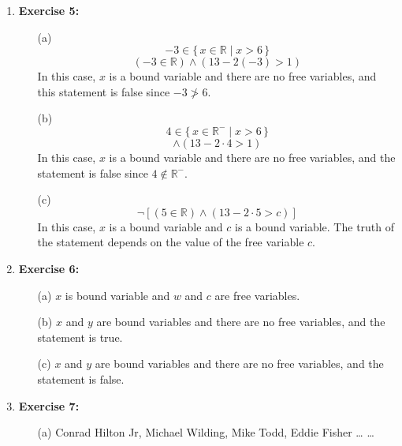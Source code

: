 \documentclass{article} %
\newcommand\Set[2]{\{\,#1\mid#2\,\}}
\begin{document}
\begin{enumerate}
        \item \textbf{Exercise 5:}
        \begin{itemize}
            \item[(a)] 
            \begin{equation*}
                -3 \in \Set{x \in \mathbb{R}}{x > 6}    
            \end{equation*} 
            \begin{equation*}
                (-3 \in \mathbb{R}) \land (13 - 2(-3) > 1)
            \end{equation*}
            In this case, $x$ is a bound variable and there are no free variables, and this statement is false since $-3 \ngtr 6$.
            \item[(b)]
            \begin{equation*}
                4 \in \Set{x \in \mathbb{R}^{-}}{x > 6}
            \end{equation*}
            \begin{equation*}
                [(4 \in \mathbb{R}) \land (4 < 0)] \land (13 - 2 \cdot 4 > 1)
            \end{equation*}
            In this case, $x$ is a bound variable and there are no free variables, and the statement is false since $4 \notin \mathbb{R}^{-}$.
            \item[(c)]
            \begin{equation*}
                \neg [(5 \in \mathbb{R}) \land (13 - 2 \cdot 5 > c)]
            \end{equation*}
            In this case, $x$ is a bound variable and $c$ is a bound variable. The truth of the statement depends on the value of the free variable $c$.
        \end{itemize}

        \item \textbf{Exercise 6:}
        \begin{itemize}
            \item[(a)] $x$ is bound variable and $w$ and $c$ are free variables.
            \item[(b)] $x$ and $y$ are bound variables and there are no free variables, and the statement is true.
            \item[(c)] $x$ and $y$ are bound variables and there are no free variables, and the statement is false.
        \end{itemize}

        \item \textbf{Exercise 7:}
        \begin{itemize}
            \item[(a)] {Conrad Hilton Jr, Michael Wilding, Mike Todd, Eddie Fisher \dots}
            \dots
        \end{itemize}

    \end{enumerate}
\end{document}
